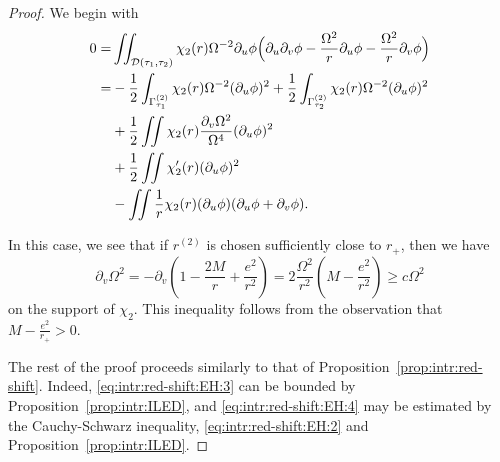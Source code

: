 \documentclass[12 pt, reqno]{amsart}
\theoremstyle{definition}
\theoremstyle{remark}
\numberwithin{equation}{section}
\newcommand{\rd}{\partial}
\newcommand{\bb}{\Big}
\newcommand{\0}{\emptyset}
\newcommand{\Gmm}{\Gamma}
\newcommand{\Omg}{\Omega}
\newcommand{\calD}{\mathcal D}
\begin{document}
\begin{proof} 
 We begin with
 \begin{align}
	0 =& \iint_{\calD(\tau_{1}, \tau_{2})} \chi_{2}(r) \Omg^{-2} \rd_{u} \phi 
				\bb( \rd_{u} \rd_{v} \phi - \frac{\Omg^{2}}{r} \rd_{u} \phi - \frac{\Omg^{2}}{r} \rd_{v} \phi \bb) \notag \\
	=& 
		-\frac{1}{2} \int_{\Gmm^{(2)}_{\tau_{1}}} \chi_{2}(r) \Omg^{-2} (\rd_{u} \phi)^{2}
		+ \frac{1}{2} \int_{\Gmm^{(2)}_{\tau_{2}}} \chi_{2}(r) \Omg^{-2} (\rd_{u} \phi)^{2} 
				\label{eq:intr:red-shift:EH:1} \\
	& + \frac{1}{2} \iint \chi_{2}(r) \frac{\rd_{v} \Omg^{2}}{\Omg^{4}} (\rd_{u} \phi)^{2} \label{eq:intr:red-shift:EH:2}\\
	&  + \frac{1}{2} \iint \chi'_{2}(r) (\rd_{u}\phi)^{2} \label{eq:intr:red-shift:EH:3}\\
	 &  - \iint \frac{1}{r} \chi_{2}(r) (\rd_{u} \phi) (\rd_{u} \phi + \rd_{v} \phi). \label{eq:intr:red-shift:EH:4}
\end{align}

In this case, we see that if $r^{(2)}$ is chosen sufficiently close to $r_{+}$, then we have
\begin{equation*}
	\rd_{v} \Omg^{2} = - \rd_{v} (1 - \frac{2M}{r} + \frac{e^{2}}{r^{2}} ) = 2 \frac{\Omg^{2}}{r^{2}} (M - \frac{e^{2}}{r^{2}}) \geq c \Omg^{2}
\end{equation*}
 on the support of $\chi_{2}$. This inequality follows from the observation that $M - \frac{e^{2}}{r_{+}} > 0$.

The rest of the proof proceeds similarly to that of Proposition~\ref{prop:intr:red-shift}. Indeed, \eqref{eq:intr:red-shift:EH:3} can be bounded by Proposition~\ref{prop:intr:ILED}, and \eqref{eq:intr:red-shift:EH:4} may be estimated by the Cauchy-Schwarz inequality, \eqref{eq:intr:red-shift:EH:2} and Proposition~\ref{prop:intr:ILED}. \qedhere 
\end{proof}
\end{document}
